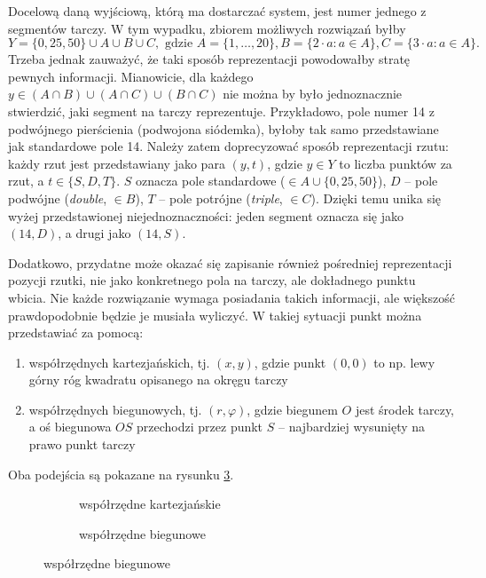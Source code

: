 Docelową daną wyjściową, którą ma dostarczać system, jest numer jednego z segmentów tarczy. W tym wypadku, zbiorem możliwych rozwiązań byłby $$Y = \{0, 25, 50\} \cup A \cup B \cup C, \textrm{ gdzie } A = \{1, \ldots, 20 \}, B = \{2 \cdot a : a \in A \}, C = \{3 \cdot a : a \in A \}.$$ Trzeba jednak zauważyć, że taki sposób reprezentacji powodowałby stratę pewnych informacji. Mianowicie, dla każdego $y \in (A \cap B) \cup (A \cap C) \cup (B \cap C)$  nie można by było jednoznacznie stwierdzić, jaki segment na tarczy reprezentuje. Przykładowo, pole numer 14 z podwójnego pierścienia (podwojona siódemka), byłoby tak samo przedstawiane jak standardowe pole 14. Należy zatem doprecyzować sposób reprezentacji rzutu: każdy rzut jest przedstawiany jako para $(y, t)$, gdzie $y \in Y$ to liczba punktów za rzut, a $t \in \{ S, D, T \}$. $S$ oznacza pole standardowe ($\in A \cup \{0, 25, 50\}$), $D$ -- pole podwójne (\textit{double}, $\in B$), $T$ -- pole potrójne (\textit{triple}, $\in C$). Dzięki temu unika się wyżej przedstawionej niejednoznaczności: jeden segment oznacza się jako $(14, D)$, a drugi jako $(14, S)$.

Dodatkowo, przydatne może okazać się zapisanie również pośredniej reprezentacji pozycji rzutki, nie jako konkretnego pola na tarczy, ale dokładnego punktu wbicia. Nie każde rozwiązanie wymaga posiadania takich informacji, ale większość prawdopodobnie będzie je musiała wyliczyć. W takiej sytuacji punkt można przedstawiać za pomocą:
\begin{enumerate}[label=(\alph*)]
	\item współrzędnych kartezjańskich, tj. $(x, y)$, gdzie punkt $(0, 0)$ to np. lewy górny róg kwadratu opisanego na okręgu tarczy
	\item współrzędnych biegunowych, tj. $(r, \varphi)$, gdzie biegunem $O$ jest środek tarczy, a oś biegunowa $OS$ przechodzi przez punkt $S$ -- najbardziej wysunięty na prawo punkt tarczy 
\end{enumerate}
Oba podejścia są pokazane na rysunku \ref{tarcza_polozenie}.

\begin{figure}[h!]
\centering
\begin{subfigure}{.5\textwidth}
  \centering
  
  \caption{współrzędne kartezjańskie}
  \label{tarcza_kartezjanskie}
\end{subfigure}%
\begin{subfigure}{.5\textwidth}
  \centering
  
  \caption{współrzędne biegunowe}
  \label{tarcza_biegunowe}
\end{subfigure}
\label{tarcza_polozenie}
\end{figure}

